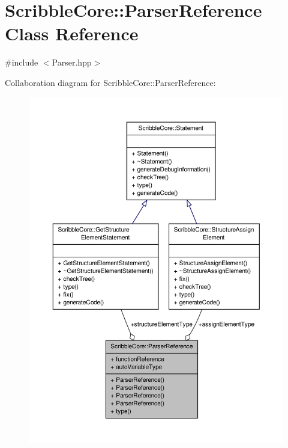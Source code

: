 \hypertarget{class_scribble_core_1_1_parser_reference}{\section{Scribble\-Core\-:\-:Parser\-Reference Class Reference}
\label{class_scribble_core_1_1_parser_reference}
}


{\ttfamily \#include $<$Parser.\-hpp$>$}



Collaboration diagram for Scribble\-Core\-:\-:Parser\-Reference\-:
\nopagebreak
\begin{figure}[H]
\begin{center}
\leavevmode
\includegraphics[width=350pt]{class_scribble_core_1_1_parser_reference__coll__graph}
\end{center}
\end{figure}
